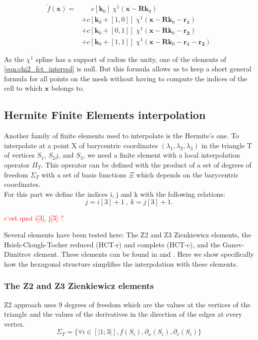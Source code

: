 \documentclass[proc]{edpsmath}
\begin{document}
\begin{align}
\label{eqn:chi2_fct_interpol}
\tilde{f}(\mathbf{x}) =& \;\;\;\;\; c[\mathbf{k}_0] \; \chi^1(\mathbf{x} - \mathbf{R}\mathbf{k}_0) \nonumber\\
	&+ c[\mathbf{k}_0 +[1,0]]\; \chi^1(\mathbf{x} - \mathbf{R}\mathbf{k}_0 - \mathbf{r_1}) \nonumber\\
	&+ c[\mathbf{k}_0 +[0,1]]\; \chi^1(\mathbf{x} - \mathbf{R}\mathbf{k}_0 - \mathbf{r_2}) \nonumber\\
	&+ c[\mathbf{k}_0 +[1,1]]\; \chi^1(\mathbf{x} - \mathbf{R}\mathbf{k}_0 - \mathbf{r_1} - \mathbf{r_2})
\end{align}

\rmrk  As the $\chi^1$ spline has a support of radius the unity, one of the elements of \eqref{eqn:chi2_fct_interpol} is null. But this formula allows us to keep a short general formula for all points on the mesh without having to compute the indices of the cell to which $\mathbf{x}$ belongs to.


\subsection{Hermite Finite Elements interpolation}

Another family of finite elements used to interpolate is the Hermite's one.
To interpolate at a point X of barycentric coordinates $(\lambda_1,\lambda_2,\lambda_3)$ in the triangle T of vertices $S_1$, $S_2j$, and $S_3$, we need a finite element with a local interpolation operator $\Pi_T $. This operator can be defined with the product of a set of degrees of freedom $\Sigma_T$ with a set of basis functions $\Xi$ which depends on the barycentric coordinates.\\
For this part we define the indices i, j and k with the following relations:
\begin{equation*}
j=i[3]+1 ~,~ k=j[3]+1.
\end{equation*}  

\textcolor{red}{c'est quoi i[3], j[3] ?}

Several elements have been tested here:
The Z2 and Z3 Zienkiewicz elements, the Hsieh-Clough-Tocher reduced (HCT-r) and complete (HCT-c), and the Ganev-Dimitrov element. These elements can be found in \cite{z} and \cite{b1} . Here we show specifically how the hexagonal structure simplifies the interpolation with these elements.\\

\subsubsection{The Z2 and Z3 Zienkiewicz elements}
Z2 approach uses 9 degrees of freedom which are the values at the vertices of the triangle and the values of the derivatives in the direction of the edges at every vertex.
\begin{equation*}
 \Sigma_T = \lbrace \forall i \in [|1;3|], f(S_i),\partial_x(S_i),\partial_v(S_i) \rbrace 
\end{equation*}
\end{document}

